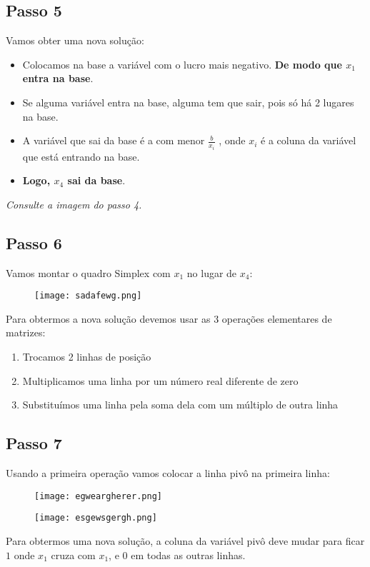 \documentclass{article}
\begin{document}
\subsection{Passo 5}
Vamos obter uma nova solução:

\begin{itemize}
    \item Colocamos na base a variável com o lucro mais negativo. \textbf{De modo que $x_1$ entra na base}.
    \item Se alguma variável entra na base, alguma tem que sair, pois só há 2 lugares na base.
    \item A variável que sai da base é a com menor $\frac{b}{x_i}$ , onde $x_i$ é a coluna da variável que está entrando na base.
    \item \textbf{Logo, $x_4$ sai da base}.
\end{itemize}

\textit{Consulte a imagem do passo 4.}

\subsection{Passo 6}
Vamos montar o quadro Simplex com $x_1$ no lugar de $x_4$:

\begin{figure}[h]
    \centering
    \texttt{[image: sadafewg.png]}
\end{figure}

Para	obtermos	a	nova	solução	devemos	usar	as	3 operações elementares de matrizes:
\begin{enumerate}
    \item Trocamos 2 linhas de posição
    \item Multiplicamos	uma	linha	por	um	número	real	diferente	de  zero
    \item Substituímos uma linha pela soma dela com um múltiplo de outra linha
\end{enumerate}


\subsection{Passo 7}

Usando a primeira operação vamos colocar a linha pivô na primeira linha:

\begin{figure}[h]
    \centering
    \texttt{[image: egweargherer.png]}
\end{figure}
\begin{figure}[h]
    \centering
    \texttt{[image: esgewsgergh.png]}
\end{figure}
Para obtermos uma nova solução, a coluna da variável pivô deve  mudar para ficar $1$ onde $x_1$ cruza com $x_1$, e 0 em todas as outras  linhas.
\end{document}
